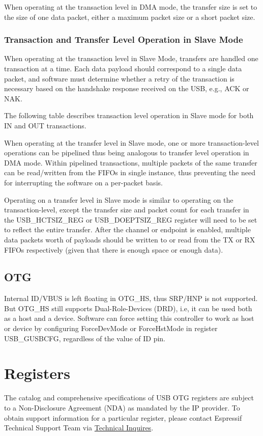 \documentclass[main\_\_EN.tex]{subfiles}
\begin{document}
When operating at the transaction level in DMA mode, the transfer size is set to the size of one data packet, either a maximum packet size or a short packet size.

\subsubsection{Transaction and Transfer Level Operation in Slave Mode}

When operating at the transaction level in Slave Mode, transfers are handled one transaction at a time. Each data payload should correspond to a single data packet, and software must determine whether a retry of the transaction is necessary based on the handshake response received on the USB, e.g., ACK or NAK.

The following table describes transaction level operation in Slave mode for both IN and OUT transactions.



When operating at the transfer level in Slave mode, one or more transaction-level operations can be pipelined thus being analogous to transfer level operation in DMA mode. Within pipelined transactions, multiple packets of the same transfer can be read/written from the FIFOs in single instance, thus preventing the need for interrupting the software on a per-packet basis.

Operating on a transfer level in Slave mode is similar to operating on the transaction-level, except the transfer size and packet count for each transfer in the USB\_HCTSIZ\_REG or USB\_DOEPTSIZ\_REG register will need to be set to reflect the entire transfer. After the channel or endpoint is enabled, multiple data packets worth of payloads should be written to or read from the TX or RX FIFOs respectively (given that there is enough space or enough data).

\subsection{OTG}

Internal ID/VBUS is left floating in OTG\_HS, thus SRP/HNP is not supported. But OTG\_HS still supports Dual-Role-Devices (DRD), i.e, it can be used both as a host and a device. Software can force setting this controller to work as host or device by configuring ForceDevMode or ForceHstMode in register USB\_GUSBCFG, regardless of the value of ID pin.

\section{Registers}

The catalog and comprehensive specifications of USB OTG registers are subject to a Non-Disclosure Agreement (NDA) as mandated by the IP provider. To obtain support information for a particular register, please contact Espressif Technical Support Team via  \href{https://www.espressif.com/en/contact-us/technical-inquiries}{Technical Inquires}.
\end{document}
